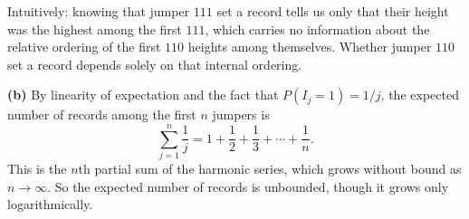 \documentclass{article}
\begin{document}
Intuitively: knowing that jumper $111$ set a record tells us only that their height was the highest among the first $111$, which carries no information about the relative ordering of the first $110$ heights among themselves. Whether jumper $110$ set a record depends solely on that internal ordering.

\medskip
\textbf{(b)} By linearity of expectation and the fact that $P(I_j=1)=1/j$, the expected number of records among the first $n$ jumpers is
$$
\sum_{j=1}^{n}\frac{1}{j}=1+\frac{1}{2}+\frac{1}{3}+\cdots+\frac{1}{n}.
$$
This is the $n$th partial sum of the harmonic series, which grows without bound as $n\to\infty$. So the expected number of records is unbounded, though it grows only logarithmically.
\end{document}

